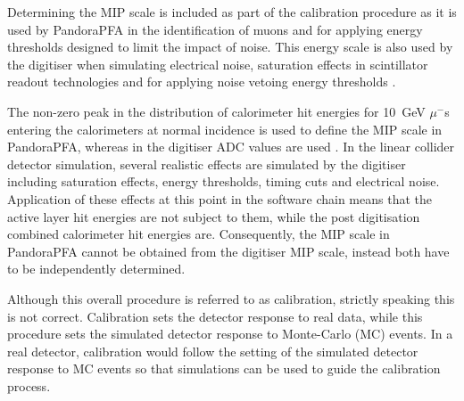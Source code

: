 Determining the MIP scale is included as part of the calibration procedure as it is used by PandoraPFA in the identification of muons and for applying energy thresholds designed to limit the impact of noise.  This energy scale is also used by the digitiser when simulating electrical noise, saturation effects in scintillator readout technologies and for applying noise vetoing energy thresholds \cite{Hartbrich:292251}.  

The non-zero peak in the distribution of calorimeter hit energies for 10~GeV $\mu^{-}$s entering the calorimeters at normal incidence is used to define the MIP scale in PandoraPFA, whereas in the digitiser ADC values are used \cite{Bichsel:2004ej}.  In the linear collider detector simulation, several realistic effects are simulated by the digitiser including saturation effects, energy thresholds, timing cuts and electrical noise.  Application of these effects at this point in the software chain means that the active layer hit energies are not subject to them, while the post digitisation combined calorimeter hit energies are.  Consequently, the MIP scale in PandoraPFA cannot be obtained from the digitiser MIP scale, instead both have to be independently determined.   

Although this overall procedure is referred to as calibration, strictly speaking this is not correct.  Calibration sets the detector response to real data, while this procedure sets the simulated detector response to Monte-Carlo (MC) events.  In a real detector, calibration would follow the setting of the simulated detector response to MC events so that simulations can be used to guide the calibration process.


